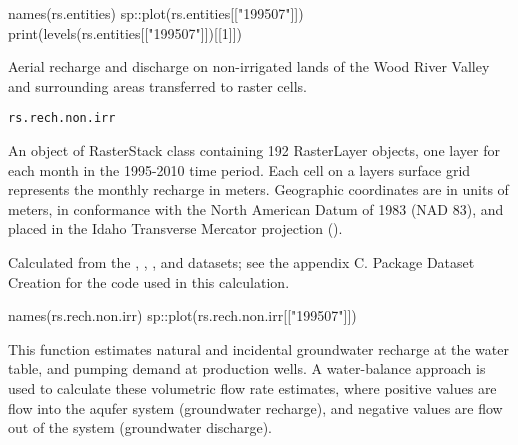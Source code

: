 \documentclass[a4paper]{book}
\begin{document}
%
\begin{Examples}
\begin{ExampleCode}
names(rs.entities)
sp::plot(rs.entities[["199507"]])
print(levels(rs.entities[["199507"]])[[1]])

\end{ExampleCode}
\end{Examples}
%
\begin{Description}\relax
Aerial recharge and discharge on non-irrigated lands of the Wood River Valley and
surrounding areas transferred to raster cells.
\end{Description}
%
\begin{Usage}
\begin{verbatim}
rs.rech.non.irr
\end{verbatim}
\end{Usage}
%
\begin{Format}
An object of RasterStack class containing 192 RasterLayer objects,
one layer for each month in the 1995-2010 time period.
Each cell on a layers surface grid represents the monthly recharge in meters.
Geographic coordinates are in units of meters, in conformance with the
North American Datum of 1983 (NAD 83), and placed in the
Idaho Transverse Mercator projection ().
\end{Format}
%
\begin{Source}\relax
Calculated from the , ,
, and  datasets;
see the appendix C. Package Dataset Creation for the \R{} code used in this calculation.
\end{Source}
%
\begin{Examples}
\begin{ExampleCode}
names(rs.rech.non.irr)
sp::plot(rs.rech.non.irr[["199507"]])

\end{ExampleCode}
\end{Examples}
%
\begin{Description}\relax
This function estimates natural and incidental groundwater recharge at the water table,
and pumping demand at production wells.
A water-balance approach is used to calculate these volumetric flow rate estimates,
where positive values are flow into the aqufer system (groundwater recharge),
and negative values are flow out of the system (groundwater discharge).
\end{Description}
\end{document}
